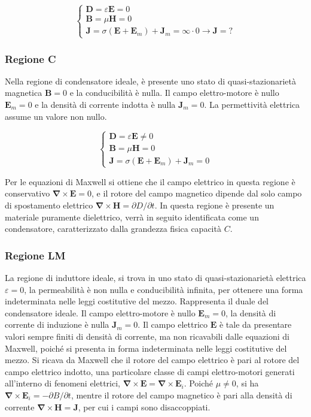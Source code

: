 \documentclass{article}
\newcommand{\vect}[1]{\boldsymbol{\mathbf{#1}}}
\numberwithin{equation}{subsection}
\begin{document}
\begin{equation*}
    \begin{cases}
        \vect{D}=\varepsilon\vect{E}=0\\
        \vect{B}=\mu\vect{H}=0\\
        \vect{J}=\sigma(\vect{E}+\vect{E}_m)+\vect{J}_m=\infty\cdot0\to\vect{J}=?
    \end{cases}
\end{equation*}

\subsubsection{Regione C}

Nella regione di condensatore ideale, è presente uno stato di quasi-stazionarietà magnetica $\vect{B}=0$ e la conducibilità è nulla. Il campo elettro-motore è nullo $\vect{E}_m=0$ 
e la densità di corrente indotta è nulla $\vect{J}_m=0$. La permettività elettrica assume un valore non nullo. 

\begin{equation*}
    \begin{cases}
        \vect{D}=\varepsilon\vect{E}\neq0\\
        \vect{B}=\mu\vect{H}=0\\
        \vect{J}=\sigma(\vect{E}+\vect{E}_m)+\vect{J}_m=0
    \end{cases}
\end{equation*}

Per le equazioni di Maxwell si ottiene che il campo elettrico in questa regione è conservativo $\vect\nabla\times\vect{E}=0$, e il rotore del campo magnetico dipende dal solo campo 
di spostamento elettrico $\vect\nabla\times\vect{H}={\partial D}/{\partial t}$. In questa regione è presente un materiale puramente dielettrico, verrà in seguito 
identificata come un condensatore, caratterizzato dalla grandezza fisica capacità $C$.

\subsubsection{Regione LM}

La regione di induttore ideale, si trova in uno stato di quasi-stazionarietà elettrica $\varepsilon=0$, la permeabilità è non nulla e conducibilità infinita, per 
ottenere una forma indeterminata nelle leggi costitutive del mezzo. Rappresenta 
il duale del condensatore ideale. Il campo elettro-motore è nullo $\vect{E}_m=0$, la densità di corrente di induzione è nulla $\vect{J}_m=0$. Il campo elettrico $\vect{E}$ è tale 
da presentare valori sempre finiti di densità di corrente, ma non ricavabili dalle equazioni di Maxwell, poiché si presenta in forma indeterminata nelle leggi costitutive del mezzo. 
Si ricava da Maxwell che il rotore del campo elettrico è pari al rotore del campo elettrico indotto, una particolare classe di campi elettro-motori generati all'interno di 
fenomeni elettrici, $\vect\nabla\times\vect{E}=\vect\nabla\times\vect{E}_i$. 
Poiché $\mu\neq0$, si ha $\vect\nabla\times\vect{E}_i=-{\partial B}/{\partial t}$, mentre il rotore del campo magnetico è pari alla densità di corrente 
$\vect\nabla\times\vect{H}=\vect{J}$, per cui i campi sono disaccoppiati. 
\end{document}
